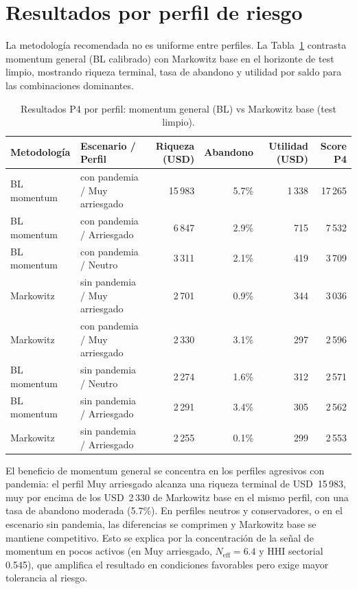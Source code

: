 \section{Resultados por perfil de riesgo}

La metodolog\'ia recomendada no es uniforme entre perfiles. La
Tabla~\ref{tab:por_perfil} contrasta momentum general (BL calibrado) con
Markowitz base en el horizonte de test limpio, mostrando riqueza terminal, tasa
de abandono y utilidad por saldo para las combinaciones dominantes.

\begin{table}[h]
\centering
\caption{Resultados P4 por perfil: momentum general (BL) vs Markowitz base
(test limpio).}
\label{tab:por_perfil}
\scriptsize
\begin{tabular}{@{}llrrrr@{}}
\toprule
Metodolog\'ia & Escenario / Perfil & Riqueza (USD) & Abandono & Utilidad (USD) & Score P4 \\
\midrule
BL momentum & con pandemia / Muy arriesgado & 15\,983 & 5.7\% & 1\,338 & 17\,265 \\
BL momentum & con pandemia / Arriesgado & 6\,847 & 2.9\% & 715 & 7\,532 \\
BL momentum & con pandemia / Neutro & 3\,311 & 2.1\% & 419 & 3\,709 \\
Markowitz & sin pandemia / Muy arriesgado & 2\,701 & 0.9\% & 344 & 3\,036 \\
Markowitz & con pandemia / Muy arriesgado & 2\,330 & 3.1\% & 297 & 2\,596 \\
BL momentum & sin pandemia / Neutro & 2\,274 & 1.6\% & 312 & 2\,571 \\
BL momentum & sin pandemia / Arriesgado & 2\,291 & 3.4\% & 305 & 2\,562 \\
Markowitz & sin pandemia / Arriesgado & 2\,255 & 0.1\% & 299 & 2\,553 \\
\bottomrule
\end{tabular}
\end{table}

El beneficio de momentum general se concentra en los perfiles agresivos con
pandemia: el perfil Muy arriesgado alcanza una riqueza terminal de USD~15\,983,
muy por encima de los USD~2\,330 de Markowitz base en el mismo perfil, con una
tasa de abandono moderada (5.7\%). En perfiles neutros y conservadores, o en el
escenario sin pandemia, las diferencias se comprimen y Markowitz base se mantiene
competitivo. Esto se explica por la concentraci\'on de la se\~nal de momentum en
pocos activos (en Muy arriesgado, $N_{\text{eff}} = 6.4$ y HHI sectorial 0.545),
que amplifica el resultado en condiciones favorables pero exige mayor tolerancia
al riesgo.

